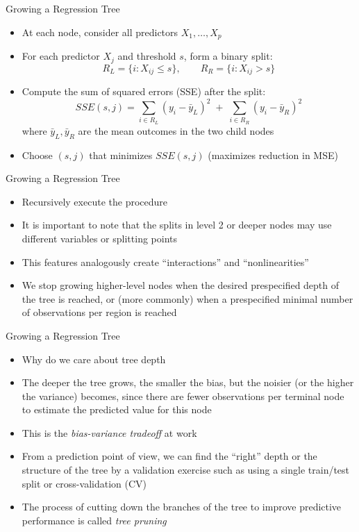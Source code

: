 \documentclass[aspectratio=1610,12pt,xcolor=dvipsnames]{beamer}
\begin{document}
\begin{frame}{Growing a Regression Tree}

\begin{itemize}
  \item At each node, consider all predictors $X_1,\dots,X_p$
  \item For each predictor $X_j$ and threshold $s$, form a binary split:
    \[
      R_L = \{i: X_{ij} \leq s\}, 
      \qquad 
      R_R = \{i: X_{ij} > s\}
    \]
  \item Compute the sum of squared errors (SSE) after the split:
    \[
      SSE(s,j) = \sum_{i \in R_L} (y_i - \bar{y}_L)^2 \;+\;
                 \sum_{i \in R_R} (y_i - \bar{y}_R)^2
    \]
    where $\bar{y}_L, \bar{y}_R$ are the mean outcomes in the two child nodes
  \item Choose $(s,j)$ that minimizes $SSE(s,j)$ (maximizes reduction in MSE)
\end{itemize}
\end{frame}

\begin{frame}{Growing a Regression Tree}

\begin{itemize}
    \item Recursively execute the procedure
    \item It is important to note that the splits in level 2 or deeper nodes may use different variables or splitting points
    \item This features analogously create ``interactions'' and ``nonlinearities'' \pause
    \item We stop growing higher-level nodes when the desired prespecified depth of the tree is reached, or (more commonly) when a prespecified minimal number of observations per region is reached
\end{itemize}
\end{frame}

\begin{frame}{Growing a Regression Tree}

\begin{itemize}
    \item Why do we care about tree depth \pause
    \item The deeper the tree grows, the smaller the bias, but the noisier (or the higher the variance) becomes, since there are fewer observations per terminal node to estimate the predicted value for this node
    \item This is the \textit{bias-variance tradeoff} at work
    \item From a prediction point of view, we can find the ``right'' depth or the structure of the tree by a validation exercise such as using a single train/test split or cross-validation (CV)
    \item The process of cutting down the branches of the tree to improve predictive performance is called \textit{tree pruning}
\end{itemize}
\end{frame}
\end{document}

